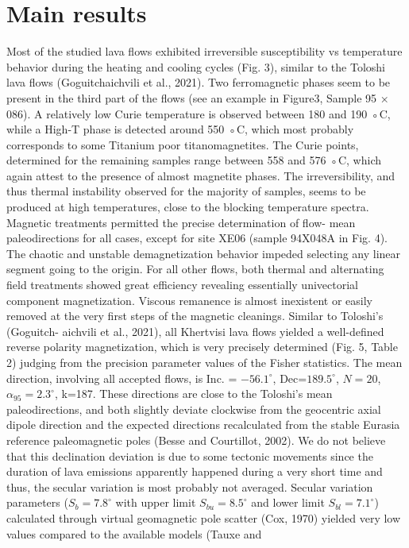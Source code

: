 \documentclass[review]{elsarticle}
\begin{document}
\section{Main results}
Most of the studied lava flows exhibited irreversible susceptibility vs
temperature behavior during the heating and cooling cycles (Fig. 3),
similar to the Toloshi lava flows (Goguitchaichvili et al., 2021). Two
ferromagnetic phases seem to be present in the third part of the flows
(see an example in Figure3, Sample 95 × 086). A relatively low Curie
temperature is observed between 180 and 190 ◦C, while a High-T phase
is detected around 550 ◦C, which most probably corresponds to some
Titanium poor titanomagnetites. The Curie points, determined for the
remaining samples range between 558 and 576 ◦C, which again attest to
the presence of almost magnetite phases. The irreversibility, and thus
thermal instability observed for the majority of samples, seems to be
produced at high temperatures, close to the blocking temperature
spectra.
Magnetic treatments permitted the precise determination of flow-
mean paleodirections for all cases, except for site XE06 (sample
94X048A in Fig. 4). The chaotic and unstable demagnetization behavior
impeded selecting any linear segment going to the origin. For all other
flows, both thermal and alternating field treatments showed great efficiency revealing essentially univectorial component magnetization.
Viscous remanence is almost inexistent or easily removed at the very
first steps of the magnetic cleanings. Similar to Toloshi’s (Goguitch-
aichvili et al., 2021), all Khertvisi lava flows yielded a well-defined
reverse polarity magnetization, which is very precisely determined
(Fig. 5, Table 2) judging from the precision parameter values of the
Fisher statistics.
The mean direction, involving all accepted flows, is Inc. = $-56.1^{\circ}$, Dec=$189.5^{\circ}$, $N=20$, $\alpha_{95}=2.3^{\circ}$, k=187. These directions are close to
the Toloshi’s mean paleodirections, and both slightly deviate clockwise
from the geocentric axial dipole direction and the expected directions
recalculated from the stable Eurasia reference paleomagnetic poles
(Besse and Courtillot, 2002). We do not believe that this declination
deviation is due to some tectonic movements since the duration of lava emissions apparently happened during a very short time and thus, the
secular variation is most probably not averaged. Secular variation parameters ($S_b=7.8^{\circ}$ with upper limit $S_{bu}=8.5^{\circ}$ and lower limit $S_{bl}=7.1^{\circ}$) calculated through virtual geomagnetic pole scatter (Cox, 1970) yielded very low values compared to the available models (Tauxe and
\end{document}
